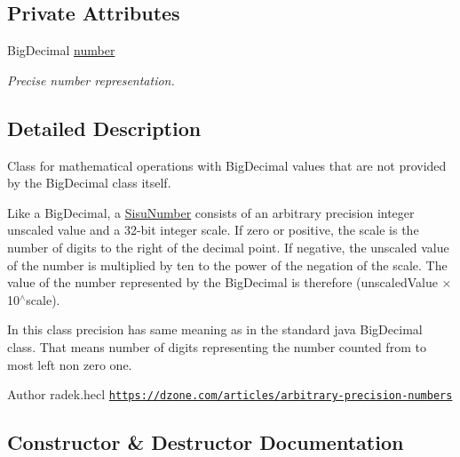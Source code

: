 \subsection*{Private Attributes}
\begin{DoxyCompactItemize}
\item 
Big\+Decimal \hyperlink{classcom_1_1aarrelaakso_1_1drawl_1_1_sisu_number_a5741c4131458787e3adb0bfe649d7758}{number}
\begin{DoxyCompactList}\small\item\em Precise number representation. \end{DoxyCompactList}\end{DoxyCompactItemize}


\subsection{Detailed Description}
Class for mathematical operations with Big\+Decimal values that are not provided by the Big\+Decimal class itself. 

Like a Big\+Decimal, a \hyperlink{classcom_1_1aarrelaakso_1_1drawl_1_1_sisu_number}{Sisu\+Number} consists of an arbitrary precision integer unscaled value and a 32-\/bit integer scale. If zero or positive, the scale is the number of digits to the right of the decimal point. If negative, the unscaled value of the number is multiplied by ten to the power of the negation of the scale. The value of the number represented by the Big\+Decimal is therefore (unscaled\+Value × 10$^\wedge$scale). 

In this class precision has same meaning as in the standard java Big\+Decimal class. That means number of digits representing the number counted from to most left non zero one.

\begin{DoxyAuthor}{Author}
radek.\+hecl  \href{https://dzone.com/articles/arbitrary-precision-numbers}{\tt https\+://dzone.\+com/articles/arbitrary-\/precision-\/numbers} 
\end{DoxyAuthor}


\subsection{Constructor \& Destructor Documentation}
\mbox{\label{classcom_1_1aarrelaakso_1_1drawl_1_1_sisu_number_a3e7b40170c4ae69461b94208a0f82f5e}} 
